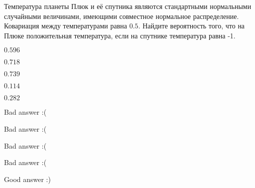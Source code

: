 
\begin{question}
Температура планеты Плюк и её спутника являются стандартными нормальными
случайными величинами, имеющими совместное нормальное распределение.
Ковариация между температурами равна \(0.5\). Найдите вероятность того,
что на Плюке положительная температура, если на спутнике температура
равна -1.
\begin{answerlist}
  \item \(0.596\)
  \item \(0.718\)
  \item \(0.739\)
  \item \(0.114\)
  \item \(0.282\)
\end{answerlist}
\end{question}

\begin{solution}
\begin{answerlist}
  \item Bad answer :(
  \item Bad answer :(
  \item Bad answer :(
  \item Bad answer :(
  \item Good answer :)
\end{answerlist}
\end{solution}

